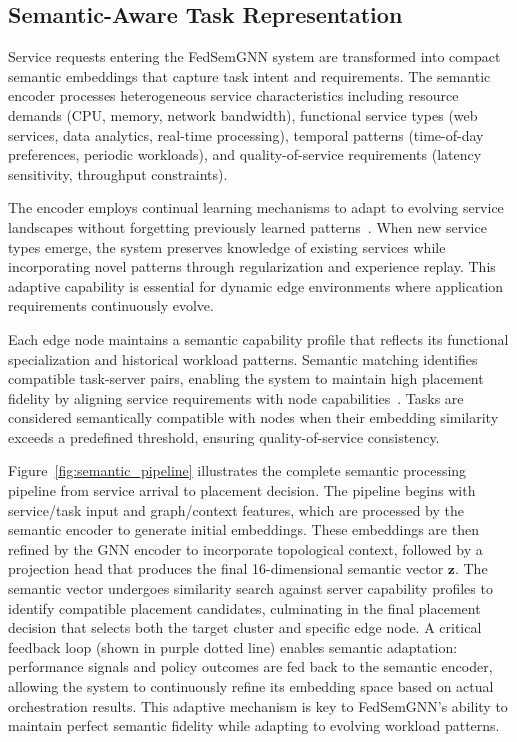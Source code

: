 \documentclass[conference]{IEEEtran}
\begin{document}
		\subsection{Semantic-Aware Task Representation}
		\label{subsec:semantic_representation}
		
		Service requests entering the FedSemGNN system are transformed into compact semantic embeddings that capture task intent and requirements. The semantic encoder processes heterogeneous service characteristics including resource demands (CPU, memory, network bandwidth), functional service types (web services, data analytics, real-time processing), temporal patterns (time-of-day preferences, periodic workloads), and quality-of-service requirements (latency sensitivity, throughput constraints).
		
		The encoder employs continual learning mechanisms to adapt to evolving service landscapes without forgetting previously learned patterns~\cite{yan2023v2v, prathiba2022}. When new service types emerge, the system preserves knowledge of existing services while incorporating novel patterns through regularization and experience replay. This adaptive capability is essential for dynamic edge environments where application requirements continuously evolve.
		
		Each edge node maintains a semantic capability profile that reflects its functional specialization and historical workload patterns. Semantic matching identifies compatible task-server pairs, enabling the system to maintain high placement fidelity by aligning service requirements with node capabilities~\cite{li2021network, jere2023distributed}. Tasks are considered semantically compatible with nodes when their embedding similarity exceeds a predefined threshold, ensuring quality-of-service consistency.
		
		Figure~\ref{fig:semantic_pipeline} illustrates the complete semantic processing pipeline from service arrival to placement decision. The pipeline begins with service/task input and graph/context features, which are processed by the semantic encoder to generate initial embeddings. These embeddings are then refined by the GNN encoder to incorporate topological context, followed by a projection head that produces the final 16-dimensional semantic vector $\mathbf{z}$. The semantic vector undergoes similarity search against server capability profiles to identify compatible placement candidates, culminating in the final placement decision that selects both the target cluster and specific edge node. A critical feedback loop (shown in purple dotted line) enables semantic adaptation: performance signals and policy outcomes are fed back to the semantic encoder, allowing the system to continuously refine its embedding space based on actual orchestration results. This adaptive mechanism is key to FedSemGNN's ability to maintain perfect semantic fidelity while adapting to evolving workload patterns.
		
\end{document}
